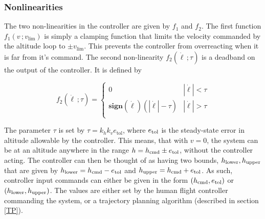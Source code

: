 \documentclass[11pt]{scrartcl} %
\begin{document}
\subsubsection{Nonlinearities}

The two non-linearities in the controller are given by $f_1$ and $f_2$. The first function $f_1(v\,;v_{\mathrm{lim}})$ is simply a clamping function that limits the velocity commanded by the altitude loop to $\pm v_{\mathrm{lim}}$. This prevents the controller from overreacting when it is far from it's command. The second non-linearity $f_2(\dot \ell \, ; \tau)$ is a deadband on the output of the controller. It is defined by 
\begin{center}
\begin{multicols}{2}
\null \vfill
\[
f_2(\dot \ell \, ; \tau) = \left\{\begin{array}{cc}
0 & |\dot \ell| < \tau \\ 
\mathrm{\textbf{sign}}(\dot \ell)(|\dot \ell| - \tau) & |\dot \ell| > \tau \\ 
\end{array}
\right.\] 
\vfill \null
{}
\end{multicols}
\end{center}

The parameter $\tau$ is set by $\tau = k_hk_ve_{\mathrm{tol}}$, where $e_{\mathrm{tol}}$ is the steady-state error in altitude allowable by the controller. This means, that with $v=0$, the system can be at an altitude anywhere in the range $h = h_{\mathrm{cmd}} \pm e_{\mathrm{tol}}$, without the controller acting. The controller can then be thought of as having two bounds, $h_{\mathrm{lower}},h_{\mathrm{upper}}$ that are given by $h_{\mathrm{lower}} = h_{\mathrm{cmd}} - e_{\mathrm{tol}}$ and $h_{\mathrm{upper}} = h_{\mathrm{cmd}} + e_{\mathrm{tol}}$. As such, controller input commands can either be given in the form $(h_{\mathrm{cmd}}, e_{\mathrm{tol}})$ or $(h_{\mathrm{lower}},h_{\mathrm{upper}})$. The values are either set by the human flight controller commanding the system, or a trajectory planning algorithm (described in section \ref{TP}).
\end{document}
